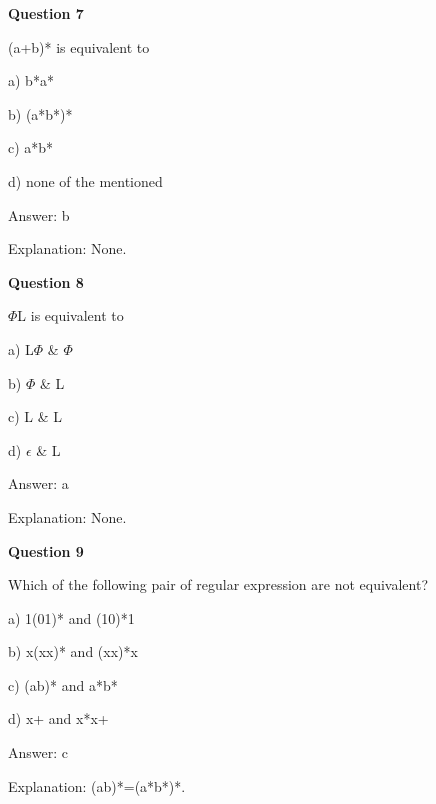 \documentclass{article}
\begin{document}
\begin{mdframed}[linewidth=1pt, roundcorner=5pt, linecolor=gray!30, backgroundcolor=gray!5]
\textbf{Question 7} 

(a+b)* is equivalent to

a) b*a*

b) (a*b*)*

c) a*b*

d) none of the mentioned
\vspace{5pt} \par
\begin{tcolorbox}[colback=green!5, colframe=green!40!black, title=Solution]
Answer: b

Explanation: None.
\end{tcolorbox}
\end{mdframed}

\begin{mdframed}[linewidth=1pt, roundcorner=5pt, linecolor=gray!30, backgroundcolor=gray!5]
\textbf{Question 8} 

$\Phi$L is equivalent to

a) L$\Phi$ \& $\Phi$

b) $\Phi$ \& L

c) L \& L

d) $\epsilon$ \& L
\vspace{5pt} \par
\begin{tcolorbox}[colback=green!5, colframe=green!40!black, title=Solution]
Answer: a

Explanation: None.
\end{tcolorbox}
\end{mdframed}

\begin{mdframed}[linewidth=1pt, roundcorner=5pt, linecolor=gray!30, backgroundcolor=gray!5]
\textbf{Question 9} 

Which of the following pair of regular expression are not equivalent?

a) 1(01)* and (10)*1

b) x(xx)* and (xx)*x

c) (ab)* and a*b*

d) x+ and x*x+
\vspace{5pt} \par
\begin{tcolorbox}[colback=green!5, colframe=green!40!black, title=Solution]
Answer: c

Explanation: (ab)*=(a*b*)*.
\end{tcolorbox}
\end{mdframed}
\newpage
\end{document}

